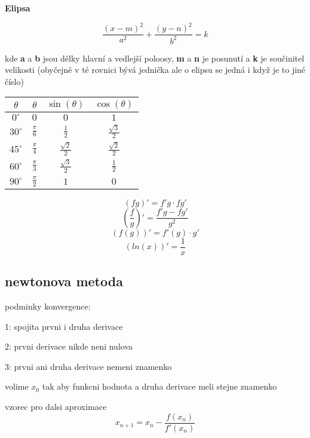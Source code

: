 \documentclass[8pt, a5paper]{extarticle}
\begin{document}
  \textbf{Elipsa}
  \begin{multicols}{2}
    \[
      \frac{(x-m)^2}{a^2} + \frac{(y-n)^2}{b^2} = k
    \]

    kde \textbf{a} a \textbf{b} jsou délky hlavní a vedlejší poloosy, \textbf{m} a \textbf{n} je posunutí a \textbf{k} je součinitel velikosti (obyčejně v té rovnici bývá jednička ale o elipsu se jedná i když je to jiné číslo)
  \end{multicols}
  \begin{multicols}{3}
    \begin{tabular}{|c|c|c|c|}
      \hline
      $\theta$ & $\theta$ & $\sin(\theta)$ & $\cos(\theta)$ \\
      \hline
      $0^\circ$ & $0$ & $0$ & $1$ \\
      $30^\circ$ & $\frac{\pi}{6}$ & $\frac{1}{2}$ & $\frac{\sqrt{3}}{2}$ \\
      $45^\circ$ & $\frac{\pi}{4}$ & $\frac{\sqrt{2}}{2}$ & $\frac{\sqrt{2}}{2}$ \\
      $60^\circ$ & $\frac{\pi}{3}$ & $\frac{\sqrt{3}}{2}$ & $\frac{1}{2}$ \\
      $90^\circ$ & $\frac{\pi}{2}$ & $1$ & $0$ \\
      \hline
    \end{tabular}

    \[
      (fg)' = f'g \cdot fg'
    \]
    \[
      \left ( \frac{f}{g} \right )' = \frac{f'g - fg'}{g^2}
    \]
    \[
      (f(g))' = f'(g) \cdot g'
    \]
    \[
      (ln(x))'=\frac{1}{x}
    \]
  \end{multicols}
  \begin{multicols}{2}
    \section{newtonova metoda}
    podminky konvergence:

    1: spojita prvni i druha derivace

    2: prvni derivace nikde neni nulova

    3: prvni ani druha derivace nemeni znamenko

    volime $x_0$ tak aby funkcni hodnota a druha derivace meli stejne znamenko

    vzorec pro dalsi aproximace
    \[
      x_{n+1}=x_n - \frac{f(x_n)}{f'(x_n)}\]
  \end{multicols}
\end{document}
